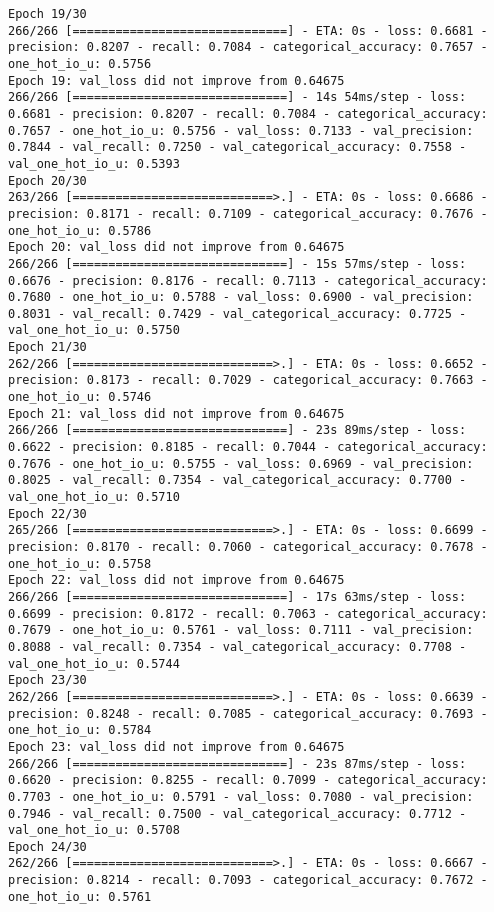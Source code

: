 \documentclass[
  letterpaper,
  DIV=11,
  numbers=noendperiod]{scrreprt}
\begin{document}
\begin{verbatim}
Epoch 19/30
266/266 [==============================] - ETA: 0s - loss: 0.6681 - precision: 0.8207 - recall: 0.7084 - categorical_accuracy: 0.7657 - one_hot_io_u: 0.5756
Epoch 19: val_loss did not improve from 0.64675
266/266 [==============================] - 14s 54ms/step - loss: 0.6681 - precision: 0.8207 - recall: 0.7084 - categorical_accuracy: 0.7657 - one_hot_io_u: 0.5756 - val_loss: 0.7133 - val_precision: 0.7844 - val_recall: 0.7250 - val_categorical_accuracy: 0.7558 - val_one_hot_io_u: 0.5393
Epoch 20/30
263/266 [============================>.] - ETA: 0s - loss: 0.6686 - precision: 0.8171 - recall: 0.7109 - categorical_accuracy: 0.7676 - one_hot_io_u: 0.5786
Epoch 20: val_loss did not improve from 0.64675
266/266 [==============================] - 15s 57ms/step - loss: 0.6676 - precision: 0.8176 - recall: 0.7113 - categorical_accuracy: 0.7680 - one_hot_io_u: 0.5788 - val_loss: 0.6900 - val_precision: 0.8031 - val_recall: 0.7429 - val_categorical_accuracy: 0.7725 - val_one_hot_io_u: 0.5750
Epoch 21/30
262/266 [============================>.] - ETA: 0s - loss: 0.6652 - precision: 0.8173 - recall: 0.7029 - categorical_accuracy: 0.7663 - one_hot_io_u: 0.5746
Epoch 21: val_loss did not improve from 0.64675
266/266 [==============================] - 23s 89ms/step - loss: 0.6622 - precision: 0.8185 - recall: 0.7044 - categorical_accuracy: 0.7676 - one_hot_io_u: 0.5755 - val_loss: 0.6969 - val_precision: 0.8025 - val_recall: 0.7354 - val_categorical_accuracy: 0.7700 - val_one_hot_io_u: 0.5710
Epoch 22/30
265/266 [============================>.] - ETA: 0s - loss: 0.6699 - precision: 0.8170 - recall: 0.7060 - categorical_accuracy: 0.7678 - one_hot_io_u: 0.5758
Epoch 22: val_loss did not improve from 0.64675
266/266 [==============================] - 17s 63ms/step - loss: 0.6699 - precision: 0.8172 - recall: 0.7063 - categorical_accuracy: 0.7679 - one_hot_io_u: 0.5761 - val_loss: 0.7111 - val_precision: 0.8088 - val_recall: 0.7354 - val_categorical_accuracy: 0.7708 - val_one_hot_io_u: 0.5744
Epoch 23/30
262/266 [============================>.] - ETA: 0s - loss: 0.6639 - precision: 0.8248 - recall: 0.7085 - categorical_accuracy: 0.7693 - one_hot_io_u: 0.5784
Epoch 23: val_loss did not improve from 0.64675
266/266 [==============================] - 23s 87ms/step - loss: 0.6620 - precision: 0.8255 - recall: 0.7099 - categorical_accuracy: 0.7703 - one_hot_io_u: 0.5791 - val_loss: 0.7080 - val_precision: 0.7946 - val_recall: 0.7500 - val_categorical_accuracy: 0.7712 - val_one_hot_io_u: 0.5708
Epoch 24/30
262/266 [============================>.] - ETA: 0s - loss: 0.6667 - precision: 0.8214 - recall: 0.7093 - categorical_accuracy: 0.7672 - one_hot_io_u: 0.5761

\end{verbatim}
\end{document}
